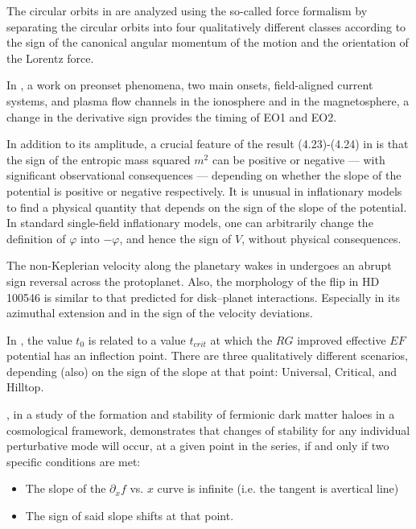 \documentclass[11pt]{book}
\begin{document}
The circular orbits in \cite{tursunov2016circular} are analyzed using
the so-called force formalism by separating the circular orbits into
four qualitatively different classes according to the sign of the
canonical angular momentum of the motion and the orientation of the
Lorentz force.

In \cite{mishin201727}, a work on preonset phenomena, two main onsets,
field-aligned current systems, and plasma flow channels in the ionosphere and in the
magnetosphere, a change in the derivative sign provides
the timing of EO1 and EO2.

In addition to its amplitude, a crucial feature of the result (4.23)-(4.24)
in \cite{garcia2018primordial} is that the sign of the entropic mass
squared $m^{2}$ can be positive or negative --- with significant
observational consequences --- depending on whether the slope of
the potential is positive or negative respectively. It is unusual
in inflationary models to find a physical quantity that depends on
the sign of the slope of the potential. In standard single-field inflationary
models, one can arbitrarily change the definition of $\varphi$ into
$-\varphi$, and hence the sign of $V$, without physical consequences.

The non-Keplerian velocity along the planetary wakes in \cite{casassus2019kinematic}
undergoes an abrupt sign reversal across the protoplanet. Also, the
morphology of the flip in HD 100546 is similar to that predicted for
disk--planet interactions. Especially in its azimuthal extension
and in the sign of the velocity deviations.

In \cite{steinwachs2020higgs}, the value $t_{0}$ is related to a
value $t_{crit}$ at which the $RG$ improved effective $EF$ potential
has an inflection point. There are three qualitatively different scenarios,
depending (also) on the sign of the slope at that point: Universal,
Critical, and Hilltop.

\cite{arguelles2021formation}, in a study of the formation and stability of fermionic dark matter haloes
in a cosmological framework, demonstrates that changes of stability
for any individual perturbative mode will occur, at a given point
in the series, if and only if two specific conditions are met:
\begin{itemize}
\item The slope of the $\partial_{x}f$ vs. $x$ curve is infinite (i.e.
the tangent is avertical line)
\item The sign of said slope shifts at that point.
\end{itemize}
\end{document}
